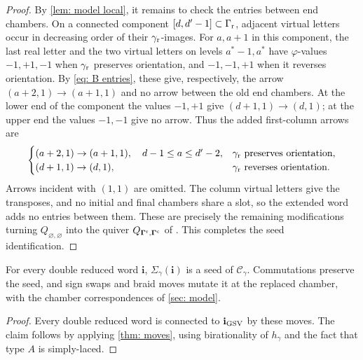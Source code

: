\documentclass[a4paper]{amsart}
\numberwithin{equation}{section}
\theoremstyle{definition}
\theoremstyle{remark}
\newcommand{\mcC}{\mathcal{C}}
\newcommand{\bfi}{\mathbf{i}}
\newcommand{\rr}{{\rm r}}
\newcommand{\cc}{{\rm c}}
\begin{document}
\begin{proof}
  By \cref{lem: model local}, it remains to check the entries between end chambers.
  On a connected component $[d,d'-1]\subset\Gamma_{\rr}$, adjacent virtual letters occur in decreasing order of their $\gamma_{\rr}$-images.
  For $a,a+1$ in this component, the last real letter and the two virtual letters on levels $a^*-1,a^*$ have $\varphi$-values $-1,+1,-1$ when $\gamma_{\rr}$ preserves orientation, and $-1,-1,+1$ when it reverses orientation.
  By \eqref{eq: B entries}, these give, respectively, the arrow $(a+2,1)\to(a+1,1)$ and no arrow between the old end chambers.
  At the lower end of the component the values $-1,+1$ give $(d+1,1)\to(d,1)$; at the upper end the values $-1,-1$ give no arrow.
  Thus the added first-column arrows are
  \[
    \begin{cases}
      (a+2,1)\to(a+1,1),\quad d-1\le a\le d'-2,&\gamma_{\rr}\text{ preserves orientation},\\
      (d+1,1)\to(d,1),&\gamma_{\rr}\text{ reverses orientation}.
    \end{cases}
  \]
  Arrows incident with $(1,1)$ are omitted.
  The column virtual letters give the transposes, and no initial and final chambers share a slot, so the extended word adds no entries between them.
  These are precisely the remaining modifications turning $Q_{\varnothing,\varnothing}$ into the quiver $Q_{\mathbf\Gamma^\rr,\mathbf\Gamma^\cc}$ of \cite[Section~4.3]{GSV23}. This completes the seed identification.
\end{proof}

\begin{corollary}
  \label{thm: model concise}
  For every double reduced word $\bfi$, $\Sigma_\gamma(\bfi)$ is a seed of $\mcC_\gamma$.
  Commutations preserve the seed, and sign swaps and braid moves mutate it at the replaced chamber, with the chamber correspondences of \cref{sec: model}.
\end{corollary}
\begin{proof}
  Every double reduced word is connected to $\bfi_{\rm GSV}$ by these moves.
  The claim follows by applying \cref{thm: moves}, using birationality of $h_\gamma$ and the fact that type $A$ is simply-laced.
\end{proof}
\end{document}
